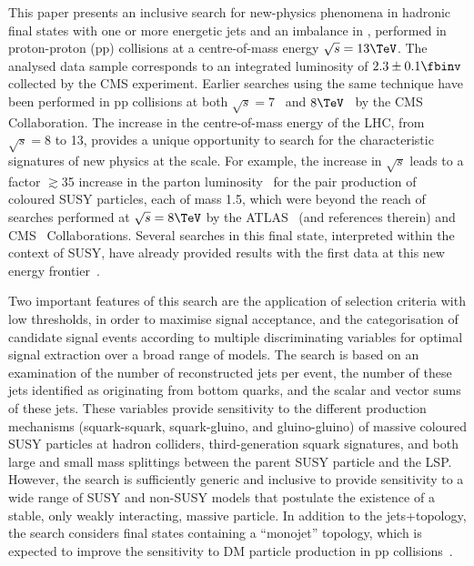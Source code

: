 This paper presents an inclusive search for new-physics phenomena in
hadronic final states with one or more energetic jets and an imbalance
in \ptvecmiss, performed in proton-proton (pp) collisions at a
centre-of-mass energy $\sqrt{s} = 13\TeV$. The analysed data sample
corresponds to an integrated luminosity of $2.3 \pm 0.1\fbinv$
collected by the CMS experiment. Earlier searches using the same
technique have been performed in pp collisions at both $\sqrt{s} =
7$~\cite{RA1Paper, RA1Paper2011, RA1Paper2011FULL} and
$8\TeV$~\cite{RA1Paper2012, RA1Parked} by the CMS Collaboration.
The increase in the centre-of-mass energy of the LHC, from $\sqrt{s} =
8$ to 13\TeV, provides a unique opportunity to search for the
characteristic signatures of new physics at the \TeV scale. For
example, the increase in $\sqrt{s}$ leads to a factor $\gtrsim$35
increase in the parton luminosity~\cite{susynlo} for the pair
production of coloured SUSY particles, each of mass 1.5\TeV, which
were beyond the reach of searches performed at $\sqrt{s} = 8\TeV$ by
the ATLAS~\cite{Aad:2015iea, Aad:2015pfx} (and references therein) and
CMS~\cite{CMS:2014dpa, Khachatryan:2015vra, Khachatryan:2016oia,
  Chatrchyan:2013wxa, Chatrchyan:2014lfa, Khachatryan:2015pwa,
  Khachatryan:2015wza, Khachatryan:2016zcu} Collaborations. Several
searches in this final state, interpreted within the context of SUSY,
have already provided results with the first data at this new energy
frontier~\cite{Aad:2016jxj, Aaboud:2016tnv, Aaboud:2016zdn,
  Aad:2016eki, Aaboud:2016nwl, Khachatryan:2016kdk, cms-13}.

Two important features of this search are the application of selection
criteria with low thresholds, in order to maximise signal acceptance,
and the categorisation of candidate signal events according to
multiple discriminating variables for optimal signal extraction over a
broad range of models. The search is based on an examination of the
number of reconstructed jets per event, the number of these jets
identified as originating from bottom quarks, and the scalar and
vector \pt sums of these jets. These variables provide sensitivity to
the different production mechanisms (squark-squark, squark-gluino, and
gluino-gluino) of massive coloured SUSY particles at hadron colliders,
third-generation squark signatures, and both large and small mass
splittings between the parent SUSY particle and the LSP. However, the
search is sufficiently generic and inclusive to provide sensitivity to
a wide range of SUSY and non-SUSY models that postulate the existence
of a stable, only weakly interacting, massive particle. In addition to
the jets+\ptvecmiss topology, the search considers final states
containing a ``monojet'' topology, which is expected to improve the
sensitivity to DM particle production in pp
collisions~\cite{Fox:2012ee, Buchmueller:2015eea}.

